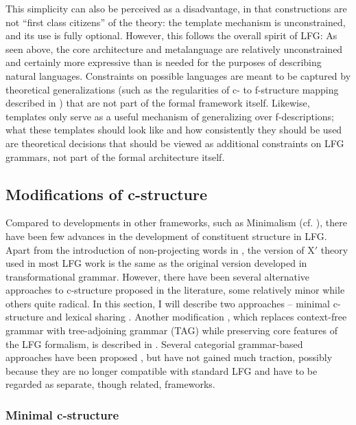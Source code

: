 \documentclass[output=paper,hidelinks]{langscibook}
\begin{document}
 This simplicity can also be perceived as a disadvantage, in that constructions are not ``first class citizens'' of the theory: the template mechanism is unconstrained, and its use is fully optional. However, this follows the overall spirit of LFG: As seen above, the core architecture and metalanguage are relatively unconstrained and certainly more expressive than is needed for the purposes of describing natural languages. Constraints on possible languages are meant to be captured by theoretical generalizations (such as the regularities of c- to f-structure mapping described in ) that are not part of the formal framework itself. Likewise, templates only serve as a useful mechanism of generalizing over f-descriptions; what these templates should look like and how consistently they should be used are theoretical decisions that should be viewed as additional constraints on LFG grammars, not part of the formal architecture itself. 
 
 \subsection{Modifications of c-structure\label{sect:cmod}}

 Compared to developments in other frameworks, such as Minimalism (cf. \cite{adger2013}), there have been few advances in the development of constituent structure in LFG. Apart from the introduction of non-projecting words in \textcite{Toivonen:NonProj}, the version of X$'$ theory used in most LFG work is the same as the original version developed in transformational grammar. However, there have been several alternative approaches to c-structure proposed in the literature, some relatively minor while others quite radical. In this section, I will describe two approaches -- minimal c-structure \parencite{lovestrand-lowe2017} and lexical sharing \parencite{wescoat2002}. Another modification \parencite{findlay2017,findlay2019}, which replaces context-free grammar with tree-adjoining grammar (TAG) while preserving core features of the LFG formalism, is described in . Several categorial grammar-based approaches have been proposed \parencite{oehrle1999,muskens2001,kokkonidis2007}, but have not gained much traction, possibly because they are no longer compatible with standard LFG and have to be regarded as separate, though related, frameworks.
 
 \subsubsection{Minimal c-structure\label{sect:minimal}}
 
\end{document}
